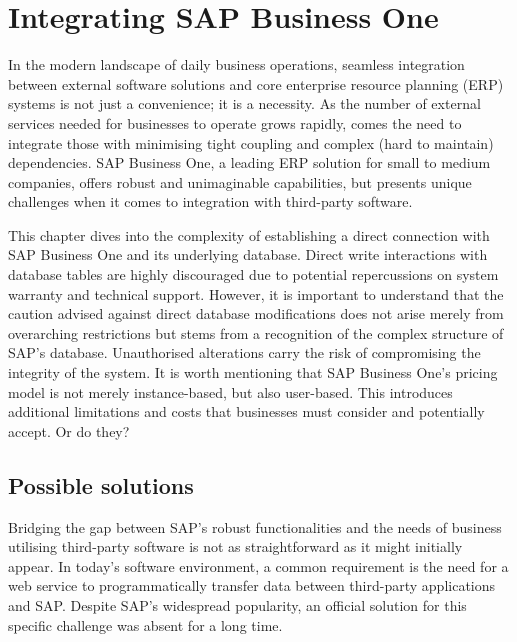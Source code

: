 \chapter{Integrating SAP Business One}
\label{chap:integrating-sap-b1}

In the modern landscape of daily business operations, seamless integration between external software solutions and core enterprise resource planning (ERP) systems is not just a convenience; it is a necessity.
As the number of external services needed for businesses to operate grows rapidly, comes the need to integrate those with minimising tight coupling and complex (hard to maintain) dependencies.
SAP Business One, a leading ERP solution for small to medium companies, offers robust and unimaginable capabilities, but presents unique challenges when it comes to integration with third-party software. 

This chapter dives into the complexity of establishing a direct connection with SAP Business One and its underlying database. 
Direct write interactions with database tables are highly discouraged due to potential repercussions on system warranty and technical support.
However, it is important to understand that the caution advised against direct database modifications does not arise merely from overarching restrictions but stems from a recognition of the complex structure of SAP's database. Unauthorised alterations carry the risk of compromising the integrity of the system.
It is worth mentioning that SAP Business One's pricing model is not merely instance-based, but also user-based.
This introduces additional limitations and costs that businesses must consider and potentially accept. 
Or do they?

\section{Possible solutions}
\label{sec:possible-solutions}

Bridging the gap between SAP's robust functionalities and the needs of business utilising third-party software is not as straightforward as it might initially appear. 
In today's software environment, a common requirement is the need for a web service to programmatically transfer data between third-party applications and SAP.
Despite SAP's widespread popularity, an official solution for this specific challenge was absent for a long time.

